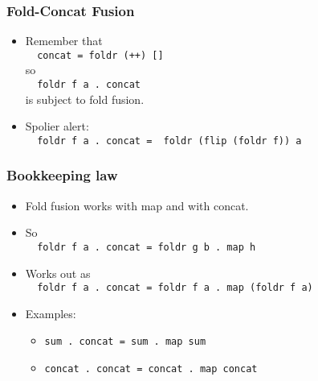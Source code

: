\documentclass{beamer}
\begin{document}
\begin{frame}[fragile]
    \frametitle{Fold-Concat Fusion}

\begin{itemize}
    \item Remember that\\
    \verb?  concat = foldr (++) []?\\
    so\\
    \verb?  foldr f a . concat?\\
    is subject to fold fusion.\\
    \item Spolier alert:\\
    \verb?  foldr f a . concat =  foldr (flip (foldr f)) a?
\end{itemize}

\end{frame}

\begin{frame}[fragile]
    \frametitle{Bookkeeping law}

    \begin{itemize}
        \item Fold fusion works with map and with concat.
        \item So \\
        \verb?  foldr f a . concat = foldr g b . map h?
        \item Works out as \\
        \verb?  foldr f a . concat = foldr f a . map (foldr f a)?
        \item Examples:
        \begin{itemize}
            \item \verb?sum . concat = sum . map sum?
            \item \verb?concat . concat = concat . map concat?
        \end{itemize}
    \end{itemize}

\end{frame}
\end{document}
